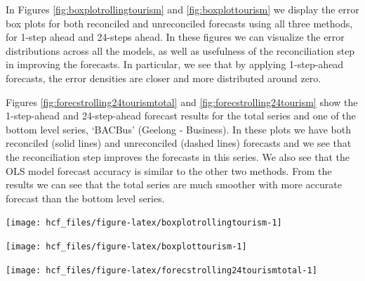 \documentclass[11pt,a4paper,]{article}
\let\origfigure\figure
\let\endorigfigure\endfigure
\renewenvironment{figure}[1][2] {
    \expandafter\origfigure\expandafter[!htbp]
} {
    \endorigfigure
}
\begin{document}
In Figures \ref{fig:boxplotrollingtourism} and \ref{fig:boxplottourism} we display the error box plots for both reconciled and unreconciled forecasts using all three methods, for 1-step ahead and 24-steps ahead. In these figures we can visualize the error distributions across all the models, as well as usefulness of the reconciliation step in improving the forecasts. In particular, we see that by applying 1-step-ahead forecasts, the error densities are closer and more distributed around zero.

Figures \ref{fig:forecstrolling24tourismtotal} and \ref{fig:forecstrolling24tourism} show the 1-step-ahead and 24-step-ahead forecast results for the total series and one of the bottom level series, `BACBus' (Geelong - Business). In these plots we have both reconciled (solid lines) and unreconciled (dashed lines) forecasts and we see that the reconciliation step improves the forecasts in this series. We also see that the OLS model forecast accuracy is similar to the other two methods. From the results we can see that the total series are much smoother with more accurate forecast than the bottom level series.

\begin{figure}

{\centering \texttt{[image: hcf\_files/figure-latex/boxplotrollingtourism-1]} 

}

\caption{Box plots of forecast errors from reconciled and unreconciled ETS, ARIMA and OLS methods at each hierarchical level for 1-step-ahead tourism demand.}\label{fig:boxplotrollingtourism}
\end{figure}

\begin{figure}

{\centering \texttt{[image: hcf\_files/figure-latex/boxplottourism-1]} 

}

\caption{Box plots of forecast errors for reconciled and unreconciled ETS, ARIMA and OLS methods at each hierarchical level for 24-step-ahead tourism demand.}\label{fig:boxplottourism}
\end{figure}

\begin{figure}

{\centering \texttt{[image: hcf\_files/figure-latex/forecstrolling24tourismtotal-1]} 

}

\caption{The actual test set for the 'Total series' compared to the forecasts from reconciled and unreconciled ETS, ARIMA and OLS methods for 1-step-ahead and 24-step-ahead tourism demand.}\label{fig:forecstrolling24tourismtotal}
\end{figure}
\end{document}
